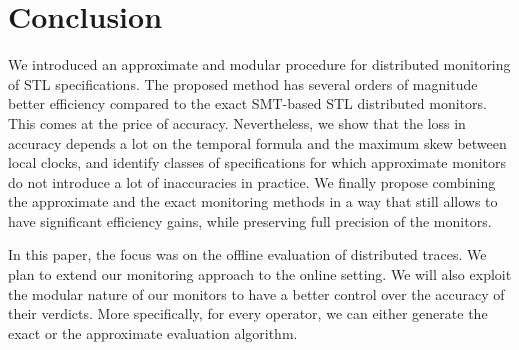 \section{Conclusion} \label{sec:conclusion}

We introduced an approximate and modular procedure for distributed monitoring of STL specifications. The proposed method has several orders of magnitude better efficiency compared to the exact SMT-based STL distributed monitors. This comes at the price of accuracy. Nevertheless, we show that the loss in accuracy depends a lot on the temporal formula and the maximum skew between local clocks, and identify classes of specifications for which approximate monitors do not introduce a lot of inaccuracies in practice. We finally propose combining the approximate and the exact monitoring methods in a way that still allows to have significant efficiency gains, while preserving full precision of the monitors.

In this paper, the focus was on the offline evaluation of distributed traces. We plan to extend our monitoring approach to the online setting. We will also exploit the modular nature of our monitors to have a better control over the accuracy of their verdicts. More specifically, for every operator, we can either generate the exact or the approximate evaluation algorithm.  

